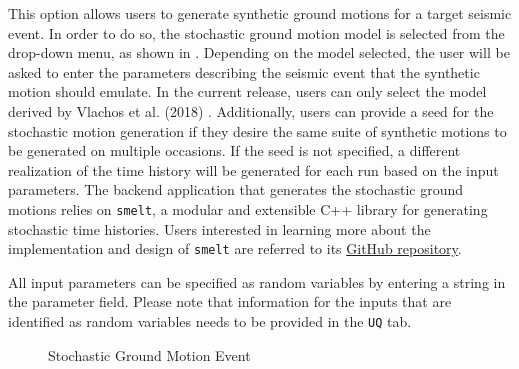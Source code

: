 This option allows users to generate synthetic ground motions for a
target seismic event. In order to do so, the stochastic ground motion
model is selected from the drop-down menu, as shown
in . Depending on the model selected, the
user will be asked to enter the parameters describing the seismic
event that the synthetic motion should emulate. In the current
release, users can only select the model derived by Vlachos et
al. (2018) \cite{vlachos2018predictive}. Additionally, users can
provide a seed for the stochastic motion generation if they desire the
same suite of synthetic motions to be generated on multiple occasions.
If the seed is not specified, a different realization of the time history
will be generated for each run based on the input parameters. The backend
application that generates the stochastic ground motions relies
on \texttt{smelt}, a modular and extensible C++ library for generating
stochastic time histories. Users interested in learning more about the
implementation and design of
\texttt{smelt} are referred to its
\href{https://github.com/NHERI-SimCenter/smelt}{GitHub repository}.

All input parameters can be specified as random variables by entering
a string in the parameter field. Please note that information for the
inputs that are identified as random variables needs to be provided in
the \texttt{UQ} tab.

\begin{figure}[!htbp]
  \caption{Stochastic Ground Motion Event}
  \label{fig:stochastic_loading}
\end{figure}
